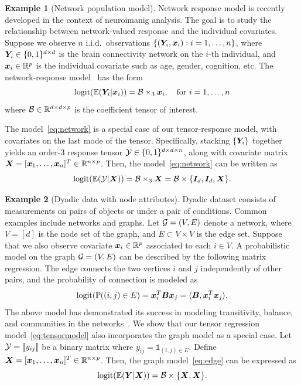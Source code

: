 \documentclass[12pt]{article}
\theoremstyle{plain}
\theoremstyle{definition}
\newtheorem{example}{Example}
\begin{document}
\begin{example}[Network population model] 
Network response model is recently developed in the context of neuroimanig analysis. The goal is to study the relationship between network-valued response and the individual covariates. Suppose we observe $n$ i.i.d.\ observations $\{(\bm Y_i, \bm x_i): i=1,\ldots,n\}$, where $\bm Y_i\in\{0,1\}^{d\times d}$ is the brain connectivity network on the $i$-th individual, and $\bm x_i\in\mathbb{R}^p$ is the individual covariate such as age, gender, cognition, etc. The network-response model~\citep{rabusseau2016low, zhang2018network} has the form
\begin{equation}\label{eq:network}
\text{logit}(\mathbb{E}(\bm Y_i|\bm x_i))=\mathcal{B}\times_3\bm x_i, \quad \text{for }i=1,\ldots,n
\end{equation}
where $\mathcal{B}\in \mathbb{R}^{d\times d\times p}$ is the coefficient tensor of interest. 

The model~\eqref{eq:network} is a special case of our tensor-response model, with covariates on the last mode of the tensor. Specifically, stacking $\{\bm Y_i\}$ together
yields an order-3 response tensor $\mathcal{Y}\in\{0,1\}^{d\times d\times n}$, along with covariate matrix $\bm X=[\bm x_1,\ldots,\bm x_n]^T\in\mathbb{R}^{n\times p}$. Then, the model~\eqref{eq:network} can be written as
\[
\text{logit}(\mathbb{E}(\mathcal{Y}|\bm X))=\mathcal{B}\times_3 \bm X=\mathcal{B}\times\{\bm I_d, \bm I_d, \bm X\}.
\]
 \end{example}
 
 \begin{example}[Dyadic data with node attributes] Dyadic dataset consists of measurements on pairs of objects or under a pair of conditions. Common examples include networks and graphs. Let $\mathcal{G}=(V,E)$ denote a network, where $V=[d]$ is the node set of the graph, and $E\subset V\times V$ is the edge set. Suppose that we also observe covariate $\bm x_i\in\mathbb{R}^p$ associated to each $i\in V$. A probabilistic model on the graph $\mathcal{G}=(V,E)$ can be described by the following matrix regression. The edge connects the two vertices $i$ and $j$ independently of other pairs, and the probability of connection is modeled as
\begin{equation}\label{eq:edge}
 \text{logit}(\mathbb{P}((i,j)\in E)=\bm x^T_i\bm B\bm x_j=\langle \bm B, \bm x^T_i\bm x_j\rangle.
 \end{equation}
The above model has demonstrated its success in modeling transitivity, balance, and communities in the networks~\citep{hoff2005bilinear}. We show that our tensor regression model~\eqref{eq:tensormodel} also incorporates the graph model as a special case. Let $\mathcal{Y}=\llbracket y_{ij} \rrbracket$ be a binary matrix where $y_{ij}=\mathds{1}_{(i,j)\in E}$. Define $\bm X=[\bm x_1,\ldots,\bm x_n]^T\in\mathbb{R}^{n\times p}$. Then, the graph model~\eqref{eq:edge} can be expressed as
 \[
 \text{logit}(\mathbb{E}(\bm Y|\bm X))=\mathcal{B}\times\{\bm X,\bm X\}.
 \]
\end{example}
\end{document}
